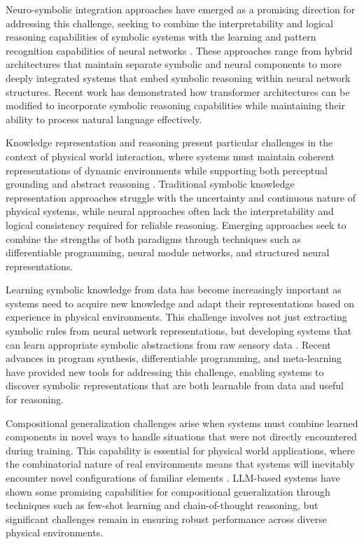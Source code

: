 Neuro-symbolic integration approaches have emerged as a promising direction for addressing this challenge, seeking to combine the interpretability and logical reasoning capabilities of symbolic systems with the learning and pattern recognition capabilities of neural networks \cite{garcez2023neurosymbolic}. These approaches range from hybrid architectures that maintain separate symbolic and neural components to more deeply integrated systems that embed symbolic reasoning within neural network structures. Recent work has demonstrated how transformer architectures can be modified to incorporate symbolic reasoning capabilities while maintaining their ability to process natural language effectively.

Knowledge representation and reasoning present particular challenges in the context of physical world interaction, where systems must maintain coherent representations of dynamic environments while supporting both perceptual grounding and abstract reasoning \cite{davis2015commonsense}. Traditional symbolic knowledge representation approaches struggle with the uncertainty and continuous nature of physical systems, while neural approaches often lack the interpretability and logical consistency required for reliable reasoning. Emerging approaches seek to combine the strengths of both paradigms through techniques such as differentiable programming, neural module networks, and structured neural representations.

Learning symbolic knowledge from data has become increasingly important as systems need to acquire new knowledge and adapt their representations based on experience in physical environments. This challenge involves not just extracting symbolic rules from neural network representations, but developing systems that can learn appropriate symbolic abstractions from raw sensory data \cite{yi2018neural}. Recent advances in program synthesis, differentiable programming, and meta-learning have provided new tools for addressing this challenge, enabling systems to discover symbolic representations that are both learnable from data and useful for reasoning.

Compositional generalization challenges arise when systems must combine learned components in novel ways to handle situations that were not directly encountered during training. This capability is essential for physical world applications, where the combinatorial nature of real environments means that systems will inevitably encounter novel configurations of familiar elements \cite{lake2017building}. LLM-based systems have shown some promising capabilities for compositional generalization through techniques such as few-shot learning and chain-of-thought reasoning, but significant challenges remain in ensuring robust performance across diverse physical environments.

